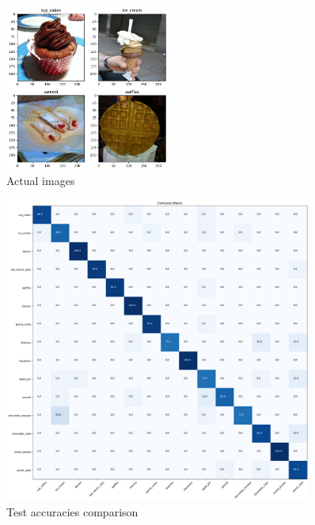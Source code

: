 \documentclass{article}
\begin{document}
\begin{multicols}{2}
    \begin{figure}[H]
        \centering
        \includegraphics[width=0.48\textwidth]{wrong_pred_images.png}
        \caption{\small Actual images}
        \label{fig:wrong_pred_images}
    \end{figure}



\end{multicols}

        \begin{figure}[H]
            \centering
            \includegraphics[width=0.9\textwidth]{confmat.png}
            \caption{\small Test accuracies comparison}
            \label{fig:confmat}
        \end{figure}




\vfill
\end{document}
